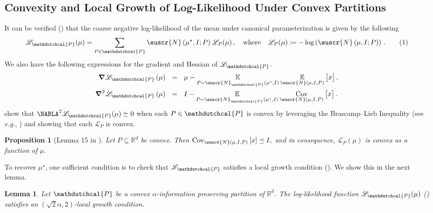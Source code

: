 \documentclass[11pt,letterpaper]{article}
\newcommand{\sset}{\subseteq}
\theoremstyle{plain}
\newtheorem{proposition}[theorem]{Proposition}
\newtheorem{lemma}[theorem]{Lemma}
\theoremstyle{definition}
\theoremstyle{remark}
\newcommand{\yesnum}{\addtocounter{equation}{1}\tag{\theequation}}
\newcommand{\quadtext}[1]{\quad\text{#1}\quad}
\newcommand{\quadwhere}{\quadtext{where}}
\newcommand{\inparen}[1]{\ensuremath{\left(#1\right)}}
\newcommand{\insquare}[1]{\ensuremath{\left[#1\right]}}
\newcommand{\R}{\mathbb{R}}
\newcommand{\E}{\operatornamewithlimits{\mathbb{E}}}
\newcommand{\Ex}{\E}
\newcommand{\cov}{\ensuremath{\operatornamewithlimits{\rm Cov}}}
\newcommand*{\Nabla}{\boldsymbol\NABLA}
\let\nabla\Nabla
\newcommand{\customcal}[1]{\euscr{#1}}
\newcommand{\cN}{\customcal{N}}
\newcommand{\eg}{\emph{e.g.}}
\newcommand{\negLL}{\ensuremath{\mathscr{L}}}
\newcommand{\hypo}[1]{\mathdutchcal{#1}}
\newcommand{\hyP}{\hypo{P}}
\newcommand{\coarseNormal}[3]{\cN_{#3}\inparen{#1,#2}}
\newcommand{\truncatedNormal}[3]{\cN\inparen{#1,#2,#3}}
\newcommand{\normalMass}[3]{\cN\inparen{#1, #2; #3}}
\newcommand{\muStar}{{\mu^\star}}
\begin{document}
{{{\subsection{Convexity and Local Growth of Log-Likelihood Under Convex Partitions}
It can be verified () that the coarse negative log-likelihood of the mean under canonical parameterization
is given by the following
\[
    \negLL_{\hyP}(\mu) = \sum_{P\in \hyP} \normalMass{\muStar}{I}{P} \negLL_{P}(\mu)\,,
    \quadwhere
    \negLL_{P}(\mu)\coloneqq -\log\inparen{
        \normalMass{\mu}{I}{P}
    }\,.
    \yesnum\label{eq:convexPartitionNLL}
\]
We also have the following expressions for the gradient and Hessian of $\negLL_\hyP$.
\begin{align*}
    \grad\negLL_\hyP\inparen{\mu}~~
    &=~~ 
        \mu
        -
        \Ex_{P\sim \coarseNormal{\muStar}{I}{\hyP}}
        {
            \Ex_{\truncatedNormal{\mu}{I}{P}}{
                \begin{bmatrix}
                    x
                \end{bmatrix}
            }
        }\,,\\
    \grad^2\negLL_\hyP\inparen{\mu}~~
    &=~~ 
        I
        - 
        \Ex_{P\sim \coarseNormal{\muStar}{I}{\hyP}}
        \cov_{\truncatedNormal{\mu}{I}{P}}{
            \begin{bmatrix}
                x
            \end{bmatrix}
        }
    \,.
\end{align*}
\cite{fotakis2021coarse} show that
$\nabla^2 \negLL_\hyP(\mu) \succeq 0$
when each $P\in \hyP$ is convex
by leveraging the Brascamp--Lieb Inequality (see \eg{}, \cite{guionnet2009large})
and showing that each $\negLL_P$ is convex.
\begin{proposition}[Lemma 15 in \cite{fotakis2021coarse}]\label{prop:convexPartitionVarianceReduction}
    Let $P\sset \R^d$ be convex.
    Then
    $
        \cov_{\truncatedNormal{\mu}{I}{P}}\insquare{
            x
        }
        \preceq I,
    $
    and in consequence,
    $\negLL_P(\mu)$ is convex as a function of $\mu$.
\end{proposition}
To recover $\muStar$,
one sufficient condition is to check that $\negLL_\hyP$ satisfies a local growth condition (). We show this in the next lemma.

\begin{lemma}\label{lem:convexPartitionLocalGrowth}
    Let $\hyP$ be a convex $\alpha$-information preserving partition of $\R^d$.
    The log-likelihood function $\negLL_\hyP(\mu)$ () satisfies an $\inparen{\sqrt2\alpha, 2}$-local growth condition.
\end{lemma}

}}}
\end{document}

